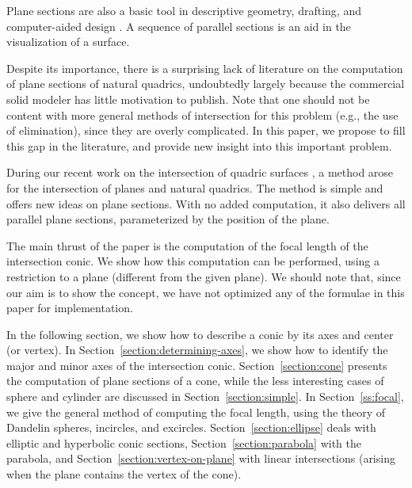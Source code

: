 Plane sections are also a basic tool in descriptive geometry, drafting,
and computer-aided design \cite{adams:1988}.
A sequence of parallel sections is an aid in the visualization of a surface.

Despite its importance, there is a surprising lack of literature 
on the computation of plane sections of natural quadrics, 
undoubtedly largely because the commercial solid modeler 
has little motivation to publish.
Note that one should not be content with
more general methods of intersection for this
problem (e.g., the use of elimination), since they are overly complicated.
In this paper, we propose to fill this gap in the literature,
and provide new insight into this important problem.

During our recent work on the intersection of quadric surfaces 
\cite{shene:1991}, 
a method arose for the intersection of planes and natural quadrics.
The method is simple and offers new ideas on plane sections.
With no added computation, it also delivers all parallel plane sections,
parameterized by the position of the plane.

The main thrust of the paper is the computation of the focal length
of the intersection conic.
We show how this computation can be performed,
using a restriction to a plane (different from the given plane).
We should note that, since our aim is to show the concept,
we have not optimized any of the formulae in this paper for implementation.

In the following section, 
we show how to describe a conic by its axes and center (or vertex).
In Section~\ref{section:determining-axes}, 
we show how to identify the major and minor axes of the intersection conic.
Section~\ref{section:cone} 
presents the computation of plane sections of a cone,
while the less interesting cases of sphere and cylinder are discussed
in Section~\ref{section:simple}.
In Section~\ref{ss:focal},
we give the general method of computing the focal length,
using the theory of Dandelin spheres, incircles, and excircles.
Section~\ref{section:ellipse} 
deals with elliptic and hyperbolic conic sections,
Section~\ref{section:parabola} with the parabola,
and Section~\ref{section:vertex-on-plane} 
with linear intersections (arising when the plane contains 
the vertex of the cone).




